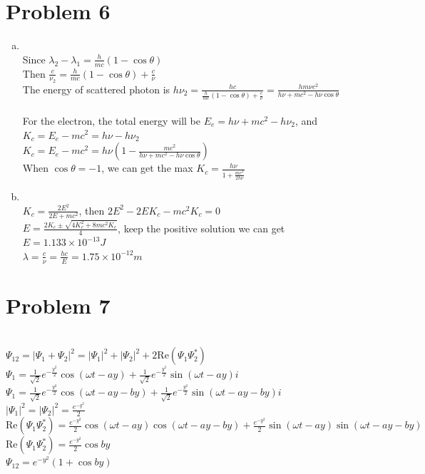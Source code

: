 \documentclass[a4paper]{article}
\begin{document}
\section{Problem 6}
\begin{enumerate}[(a)]
    \item \quad
    \\Since $\lambda_2-\lambda_1=\frac{h}{mc}(1-\cos\theta)$
    \\Then $\frac{c}{\nu_2}=\frac{h}{mc}(1-\cos\theta)+\frac{c}{\nu}$
    \\The energy of scattered photon is $h\nu_2=\frac{hc}{\frac{h}{mc}(1-\cos\theta)+\frac{c}{\nu}}=\frac{hm\nu c^2}{h\nu+mc^2-h\nu\cos\theta}$
    \\\\For the electron, the total energy will be $E_e=h\nu+mc^2-h\nu_2$, and $K_c=E_e-mc^2=h\nu-h\nu_2$
    \\$K_c=E_e-mc^2=h\nu(1-\frac{mc^2}{h\nu+mc^2-h\nu\cos\theta})$
    \\When $\cos\theta=-1$, we can get the max $K_c=\frac{h\nu}{1+\frac{mc^2}{2h\nu}}$
    \item \quad
    \\$K_c=\frac{2E^2}{2E+mc^2}$, then $2E^2-2EK_c-mc^2K_c=0$
    \\$E=\frac{2K_c\pm\sqrt{4K_c^2+8mc^2K_c}}{4}$, keep the positive solution we can get 
    \\$E=1.133\times10^{-13}J$
    \\$\lambda=\frac{c}{\nu}=\frac{hc}{E}=1.75\times10^{-12}m$
\end{enumerate}
\section{Problem 7}
    \quad
    \\$\Psi_{12}=|\Psi_1+\Psi_2|^2=|\Psi_1|^2+|\Psi_2|^2+2\mathrm{Re}(\Psi_1\Psi_2^*)$
    \\$\Psi_1=\frac{1}{\sqrt{2}}e^{-\frac{y^2}{2}}\cos(\omega t-ay)+\frac{1}{\sqrt{2}}e^{-\frac{y^2}{2}}\sin(\omega t-ay)i$
    \\$\Psi_1=\frac{1}{\sqrt{2}}e^{-\frac{y^2}{2}}\cos(\omega t-ay-by)+\frac{1}{\sqrt{2}}e^{-\frac{y^2}{2}}\sin(\omega t-ay-by)i$
    \\$|\Psi_1|^2=|\Psi_2|^2=\frac{e^{-y^2}}{2}$
    \\$\mathrm{Re}(\Psi_1\Psi_2^*)=\frac{e^{-y^2}}{2}\cos(\omega t-ay)\cos(\omega t-ay-by)+\frac{e^{-y^2}}{2}\sin(\omega t-ay)\sin(\omega t-ay-by)$
    \\$\mathrm{Re}(\Psi_1\Psi_2^*)=\frac{e^{-y^2}}{2}\cos by$
    \\$\Psi_{12}=e^{-y^2}(1+\cos by)$
\end{document}
